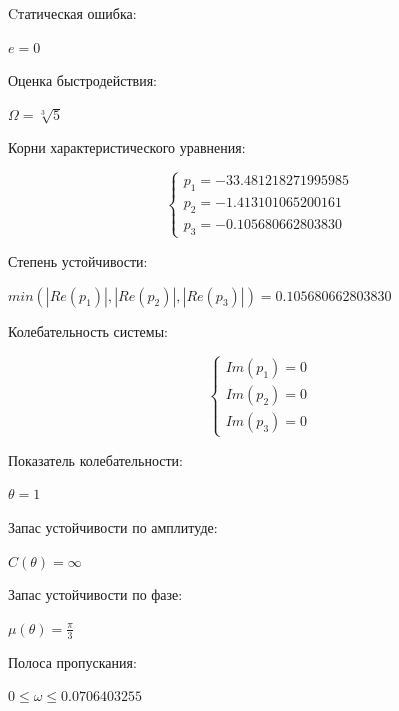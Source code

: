 \documentclass[14pt,a4paper,report]{report}
\begin{document}
	Cтатическая ошибка:
	
	\begin{center}
		$e=0$
	\end{center}
	
	Оценка быстродействия:
	
	\begin{center}
		$\Omega=\sqrt[3]{5}$
	\end{center}
	
	Корни характеристического уравнения:
	
	\begin{equation*}
	\begin{cases}
	\text{$p_1=-33.481218271995985$} \\
	\text{$p_2=-1.413101065200161$} \\
	\text{$p_3=-0.105680662803830$}
	\end{cases}
	\end{equation*}
	
	Степень устойчивости:
	
	\begin{center}
		$min(|Re(p_1)|, |Re(p_2)|, |Re(p_3)|) = 0.105680662803830$
	\end{center}
	
	Колебательность системы:
	
	\begin{equation*}
	\begin{cases}
	\text{$Im(p_1)=0$} \\
	\text{$Im(p_2)=0$} \\
	\text{$Im(p_3)=0$}
	\end{cases}
	\end{equation*}
	
	Показатель колебательности:
	
	\begin{center}
		$\theta=1$
	\end{center}
	
	
	
	Запас устойчивости по амплитуде:
	
	\begin{center}
		$C(\theta)=\infty$
	\end{center}
	
	Запас устойчивости по фазе:
	
	\begin{center}
		$\mu(\theta)=\frac{\pi}{3}$
	\end{center}
	
	Полоса пропускания:
	
	\begin{center}
		$0\leq\omega\leq0.0706403255$
	\end{center}
	
\end{document}
